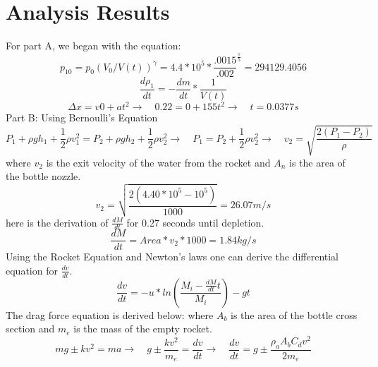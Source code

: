 \documentclass[a4paper,11pt]{article}
\begin{document}
    \section{Analysis Results}
    {}
    {For part A, we began with the equation: }
    \begin{equation} 
       p_{10} = p_{0}(V_{0}/V(t))^{\gamma} = 4.4*10^5*\frac{.0015}{.002}^{\frac{7}{5}} = 294129.4056
    \end{equation}
    {}
    \begin{equation}   
        \frac{d\rho_{1}}{dt} = -\frac{dm}{dt} * \frac{1}{V(t)}
    \end{equation}
    \begin{equation}   
        \Delta x = v0 + at^2 \rightarrow \quad 0.22 = 0 + 155t^2 \rightarrow \quad t = 0.0377s
    \end{equation}
    {Part B: Using Bernoulli's Equation}
    \begin{equation} 
        P_{1} + \rho gh_{1} + \frac{1}{2}\rho v_{1}^2 = P_{2} + \rho gh_{2} + \frac{1}{2}\rho v_{2}^2\rightarrow\quad  P_{1} = P_{2} + \frac{1}{2}\rho v_{2}^2\rightarrow \quad v_{2} = \sqrt{\frac{2(P_{1} - P_{2})}{\rho}}  
    \end{equation}
    {where $v_{2}$ is the exit velocity of the water from the rocket and $A_{n}$ is the area of the bottle nozzle.}
    \begin{equation}
        v_{2} = \sqrt{\frac{2(4.40*10^5- 10^5)}{1000}} = 26.07m/s
    \end{equation}
    {here is the derivation of $\frac{dM}{dt}$ for 0.27 seconds until depletion.}
    \begin{equation}
        \frac{dM}{dt} = Area * v_{2} * 1000 = 1.84 kg/s  
    \end{equation}
    {Using the Rocket Equation and Newton's laws one can derive the differential equation for $\frac{dv}{dt}$.}
    \begin{equation}
        \frac{dv}{dt} = -u*ln(\frac{M_{i}-\frac{dM}{dt}t}{M_{i}}) - gt
    \end{equation}
    {The drag force equation is derived below: where $A_{b}$ is the area of the bottle cross section and $m_{e}$ is the mass of the empty rocket.}
    \begin{equation}
        mg \pm kv^2 = ma \rightarrow \quad g \pm \frac{kv^2}{m_{e}} = \frac{dv}{dt} \rightarrow \quad 
        \frac{dv}{dt} = g \pm \frac{\rho_{a} A_{b}C_{d}v^2}{2m_{e}}
    \end{equation}
    
\end{document}
